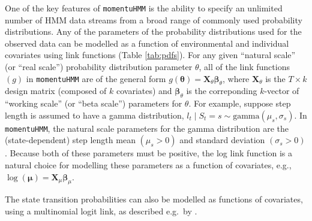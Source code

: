 \documentclass[12pt]{article}
\begin{document}
One of the key features of \verb|momentuHMM| is the ability to specify an unlimited number of HMM data streams from a broad range of commonly used probability distributions. Any of the parameters of the probability distributions used for the observed data can be modelled as a function of environmental and individual covariates using link functions (Table \ref{tab:pdfs}). For any given ``natural scale'' (or ``real scale'') probability distribution parameter $\theta$, all of the link functions $(g)$ in \verb|momentuHMM| are of the general form $g({\boldsymbol \theta}) =  {\mathbf X}_\theta{\boldsymbol \beta}_\theta$, where ${\mathbf X}_\theta$ is the $T \times k$ design matrix (composed of $k$ covariates) and ${\boldsymbol \beta}_\theta$ is the correponding $k$-vector of ``working scale'' (or ``beta scale'') parameters for $\theta$. For example, suppose step length is assumed to have a gamma distribution, $l_t\mid S_t=s \sim \text{gamma}(\mu_s,\sigma_s)$. In \verb|momentuHMM|, the natural scale parameters for the gamma distribution are the (state-dependent) step length mean $(\mu_s>0)$ and standard deviation $(\sigma_s>0)$.  Because both of these parameters must be positive, the log link function is a natural choice for modelling these parameters as a function of covariates, e.g., $\log({\boldsymbol \mu}) =  {\mathbf X}_\mu  {\boldsymbol \beta}_\mu$.

The state transition probabilities can also be modelled as functions of covariates, using a multinomial logit link, as described e.g.\ by \cite{MichelotEtAl2016}.
\end{document}
